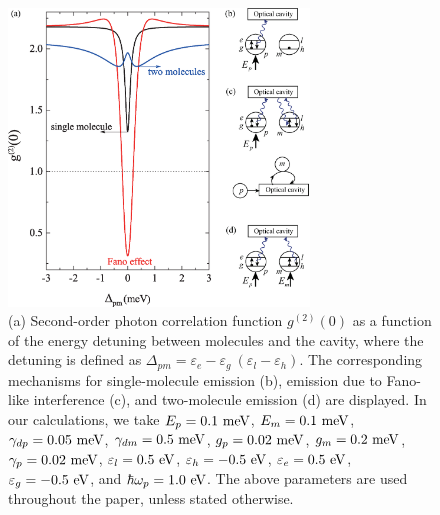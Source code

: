 \documentclass[aps,preprint,floatfix,footinbib,longbibliography]{revtex4-1}
\begin{document}
\begin{figure}[h]
\centering
\includegraphics[width=8cm]{fano-compare.eps}
\caption{(a) Second-order photon correlation function $g^{(2)}(0)$ as a function of the energy detuning between molecules and the cavity, where the detuning is defined as $\Delta_{pm}=\varepsilon_{e}-\varepsilon_{g}~(\varepsilon_{l}-\varepsilon_{h})$.
The corresponding mechanisms for single-molecule emission (b), emission due to Fano-like interference (c), and two-molecule emission (d) are displayed. In our calculations,
we take $E_{p}=0.1~{\rm meV}$, $E_{m}=0.1~{\rm meV}$, $\gamma_{dp}=0.05~{\rm meV}$, $\gamma_{dm}=0.5~{\rm meV}$, $g_{p}=0.02~{\rm meV}$, $g_{m}=0.2~{\rm meV}$, $\gamma_{p}=0.02~{\rm meV}$, $\varepsilon_{l}=0.5~{\rm eV}$, $\varepsilon_{h}=-0.5~{\rm eV}$, $\varepsilon_{e}=0.5~{\rm eV}$, $\varepsilon_{g}=-0.5~{\rm eV}$, and $\hbar\omega_{p}=1.0~{\rm eV}$.
The above parameters are used throughout the paper, unless stated otherwise. }
\label{fano-compare}
\end{figure}
\end{document}
